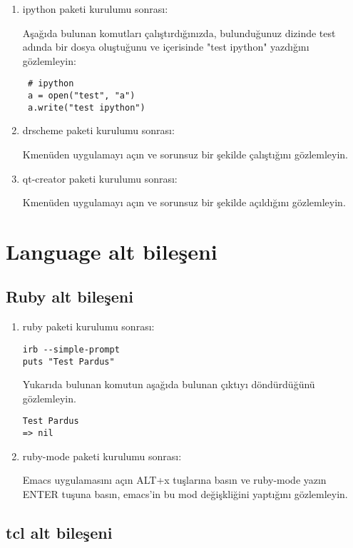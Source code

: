 \documentclass[a4paper,10pt]{article}
\begin{document}
\begin{enumerate}
\item ipython paketi kurulumu sonrası: 

Aşağıda bulunan komutları çalıştırdığınızda, bulunduğunuz dizinde test adında bir dosya oluştuğunu ve içerisinde "test ipython" yazdığını gözlemleyin:
\begin{verbatim}
 # ipython
 a = open("test", "a")
 a.write("test ipython")
\end{verbatim}

\item drscheme paketi kurulumu sonrası:

Kmenüden uygulamayı açın ve sorunsuz bir şekilde çalıştığını gözlemleyin.

\item qt-creator paketi kurulumu sonrası:

Kmenüden uygulamayı açın ve sorunsuz bir şekilde açıldığını gözlemleyin.
\end{enumerate}


\section{Language alt bileşeni}

\subsection{Ruby alt bileşeni}

\begin{enumerate}
 \item ruby paketi kurulumu sonrası:

\begin{verbatim}
irb --simple-prompt 
puts "Test Pardus"
\end{verbatim}

Yukarıda bulunan komutun aşağıda bulunan çıktıyı döndürdüğünü gözlemleyin.
\begin{verbatim}
Test Pardus
=> nil
\end{verbatim}

\item ruby-mode paketi kurulumu sonrası:

Emacs uygulamasını açın ALT+x tuşlarına basın ve ruby-mode yazın ENTER tuşuna basın, emacs'in bu mod değişkliğini yaptığını gözlemleyin.
\end{enumerate}

\subsection{tcl alt bileşeni}
\end{document}

